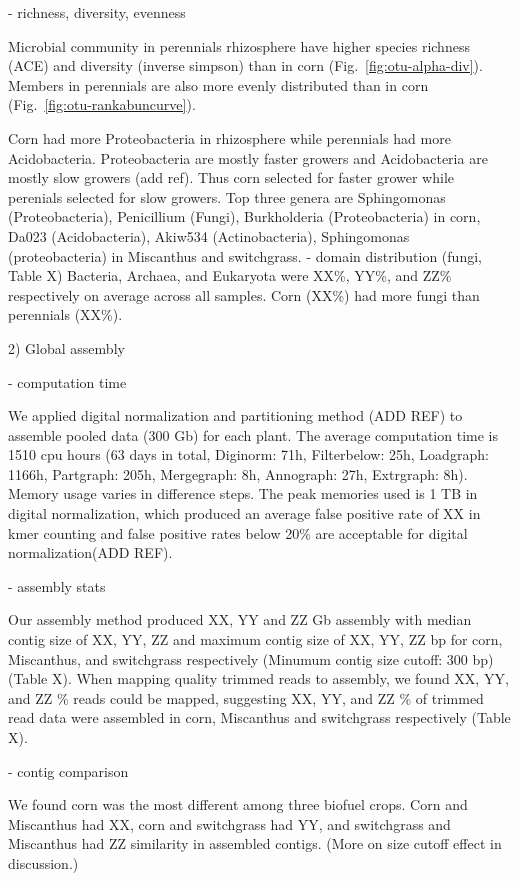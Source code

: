 \documentclass[12pt]{article}
\begin{document}
- richness, diversity, evenness

Microbial community in perennials rhizosphere have higher species richness (ACE) and diversity (inverse simpson) than in corn (Fig.~\ref{fig:otu-alpha-div}). Members in perennials are also more evenly distributed than in corn (Fig.~\ref{fig:otu-rankabuncurve}).

Corn had more Proteobacteria in rhizosphere while perennials had more Acidobacteria. Proteobacteria are mostly faster growers and Acidobacteria are mostly slow growers (add ref). Thus corn selected for faster grower while perenials selected for slow growers. Top three genera are Sphingomonas (Proteobacteria), Penicillium (Fungi), Burkholderia (Proteobacteria) in corn, Da023 (Acidobacteria), Akiw534 (Actinobacteria), Sphingomonas (proteobacteria) in Miscanthus and switchgrass. 
- domain distribution (fungi, Table X)
Bacteria, Archaea, and Eukaryota were XX\%, YY\%, and ZZ\% respectively on average across all samples. Corn (XX\%) had more fungi than perennials (XX\%).
  
2) Global assembly

- computation time

We applied digital normalization and partitioning method (ADD REF) to assemble pooled data (300 Gb) for each plant. The average computation time is 1510 cpu hours (63 days in total, Diginorm: 71h, Filterbelow: 25h, Loadgraph: 1166h, Partgraph: 205h, Mergegraph: 8h, Annograph: 27h, Extrgraph: 8h). Memory usage varies in difference steps. The peak memories used is 1 TB in digital normalization, which produced an average false positive rate of XX in kmer counting and false positive rates below 20\% are acceptable for digital normalization(ADD REF). 

- assembly stats

Our assembly method produced  XX, YY and ZZ Gb assembly with median contig size of XX, YY, ZZ and maximum contig size of XX, YY, ZZ bp for corn, Miscanthus, and switchgrass respectively (Minumum contig size cutoff: 300 bp)(Table X). When mapping quality trimmed reads to assembly, we found XX, YY, and ZZ \% reads could be mapped, suggesting XX, YY, and ZZ \% of trimmed read data were assembled in corn, Miscanthus and switchgrass respectively (Table X).

- contig comparison

We found corn was the most different among three biofuel crops.  Corn and Miscanthus had XX, corn and switchgrass had YY, and switchgrass and Miscanthus had ZZ similarity in assembled contigs. (More on size cutoff effect in discussion.)
\end{document}
